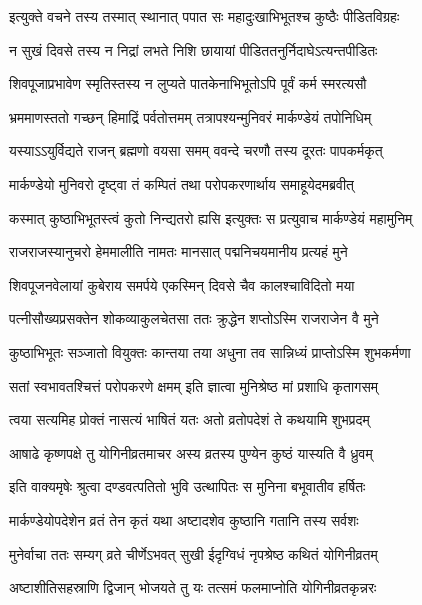 \twolineshloka
{इत्युक्ते वचने तस्य तस्मात् स्थानात् पपात सः}
{महादुःखाभिभूतश्च कुष्ठैः पीडितविग्रहः}%

\twolineshloka
{न सुखं दिवसे तस्य न निद्रां लभते निशि}
{छायायां पीडिततनुर्निदाघेऽत्यन्तपीडितः}%

\twolineshloka
{शिवपूजाप्रभावेण स्मृतिस्तस्य न लुप्यते}
{पातकेनाभिभूतोऽपि पूर्वं कर्म स्मरत्यसौ}%

\twolineshloka
{भ्रममाणस्ततो गच्छन् हिमाद्रिं पर्वतोत्तमम्}
{तत्रापश्यन्मुनिवरं मार्कण्डेयं तपोनिधिम्}%

\twolineshloka
{यस्याऽऽयुर्विद्यते राजन् ब्रह्मणो वयसा समम्}
{ववन्दे चरणौ तस्य दूरतः पापकर्मकृत्}%

\twolineshloka
{मार्कण्डेयो मुनिवरो दृष्ट्वा तं कम्पितं तथा}
{परोपकरणार्थाय समाहूयेदमब्रवीत्}%

\twolineshloka
{कस्मात् कुष्ठाभिभूतस्त्वं कुतो निन्द्यतरो ह्यसि}
{इत्युक्तः स प्रत्युवाच मार्कण्डेयं महामुनिम्}%


\twolineshloka
{राजराजस्यानुचरो हेममालीति नामतः}
{मानसात् पद्मनिचयमानीय प्रत्यहं मुने}%

\twolineshloka
{शिवपूजनवेलायां कुबेराय समर्पये}
{एकस्मिन् दिवसे चैव कालश्चाविदितो मया}%

\twolineshloka
{पत्नीसौख्यप्रसक्तेन शोकव्याकुलचेतसा}
{ततः क्रुद्धेन शप्तोऽस्मि राजराजेन वै मुने}%

\twolineshloka
{कुष्ठाभिभूतः सञ्जातो वियुक्तः कान्तया तया}
{अधुना तव सान्निध्यं प्राप्तोऽस्मि शुभकर्मणा}%

\twolineshloka
{सतां स्वभावतश्चित्तं परोपकरणे क्षमम्}
{इति ज्ञात्वा मुनिश्रेष्ठ मां प्रशाधि कृतागसम्}%


\twolineshloka
{त्वया सत्यमिह प्रोक्तं नासत्यं भाषितं यतः}
{अतो व्रतोपदेशं ते कथयामि शुभप्रदम्}%

\twolineshloka
{आषाढे कृष्णपक्षे तु योगिनीव्रतमाचर}
{अस्य व्रतस्य पुण्येन कुष्ठं यास्यति वै ध्रुवम्}%

\twolineshloka
{इति वाक्यमृषेः श्रुत्वा दण्डवत्पतितो भुवि}
{उत्थापितः स मुनिना बभूवातीव हर्षितः}%

\twolineshloka
{मार्कण्डेयोपदेशेन व्रतं तेन कृतं यथा}
{अष्टादशेव कुष्ठानि गतानि तस्य सर्वशः}%

\twolineshloka
{मुनेर्वाचा ततः सम्यग् व्रते चीर्णेऽभवत् सुखी}
{ईदृग्विधं नृपश्रेष्ठ कथितं योगिनीव्रतम्}%

\twolineshloka
{अष्टाशीतिसहस्राणि द्विजान् भोजयते तु यः}
{तत्समं फलमाप्नोति योगिनीव्रतकृन्नरः}%

